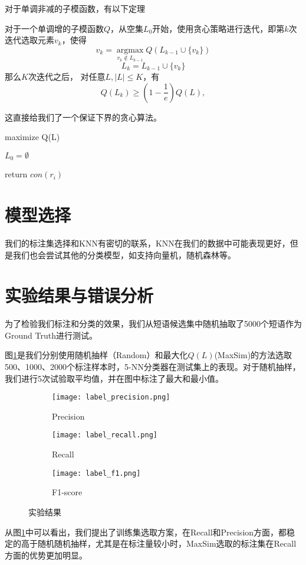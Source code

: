 对于单调非减的子模函数，有以下定理
\begin{theorem}
对于一个单调增的子模函数$Q$，从空集$L_0$开始，使用贪心策略进行迭代，即第$k$次迭代选取元素$v_k$，使得
\[
	v_k = \mathop {\arg \max }\limits_{v_k \notin L_{k-1} } Q(L_{k-1}\cup \{v_k\}) 
\]
\[
	L_k = L_{k-1} \cup \{ v_k \} 
\]
那么$K$次迭代之后， 对任意$L, |L| \le K$，有
\[
	Q(L_k) \ge (1-\frac{1}{e}) Q(L),
\]
\end{theorem}

这直接给我们了一个保证下界的贪心算法。
\begin{algorithm}
  \caption{maximize Q(L)}
  $L_0 = \emptyset$\;
  {

  }
  return $con(r_i)$\;
\end{algorithm}

\section{模型选择}
我们的标注集选择和KNN有密切的联系，KNN在我们的数据中可能表现更好，但是我们也会尝试其他的分类模型，如支持向量机，随机森林等。

\section{实验结果与错误分析}
为了检验我们标注和分类的效果，我们从短语候选集中随机抽取了5000个短语作为Ground Truth进行测试。

图\ref{fig:testing_vs_random}是我们分别使用随机抽样（Random）和最大化$Q(L)$(MaxSim)的方法选取500、1000、2000个标注样本时，5-NN分类器在测试集上的表现。对于随机抽样，我们进行5次试验取平均值，并在图中标注了最大和最小值。

\begin{figure}[h!]
  \centering
  \begin{subfigure}{0.4\textwidth}
    \texttt{[image: label\_precision.png]}
    \caption{Precision}
  \end{subfigure}
  \hspace{2em}%
  \begin{subfigure}{0.4\textwidth}
    \texttt{[image: label\_recall.png]}
    \caption{Recall}
  \end{subfigure}
  \hspace{2em}
  \begin{subfigure}{0.4\textwidth}
  	\texttt{[image: label\_f1.png]}
  	\caption{F1-score}
  \end{subfigure}
  \caption{实验结果}
  \label{fig:testing_vs_random}
\end{figure}
从图\ref{fig:testing_vs_random}中可以看出，我们提出了训练集选取方案，在Recall和Precision方面，都稳定的高于随机随机抽样，尤其是在标注量较小时，MaxSim选取的标注集在Recall方面的优势更加明显。


